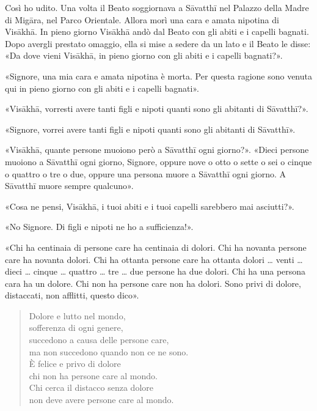 

 Così ho udito. Una volta il Beato soggiornava a Sāvatthī nel
Palazzo della Madre di Migāra, nel Parco Orientale. Allora morì una cara
e amata nipotina di Visākhā. In pieno giorno Visākhā andò dal Beato con
gli abiti e i capelli bagnati. Dopo avergli prestato omaggio, ella si
mise a sedere da un lato e il Beato le disse: «Da dove vieni Visākhā, in
pieno giorno con gli abiti e i capelli bagnati?».


«Signore, una mia cara e amata nipotina è morta. Per questa ragione sono
venuta qui in pieno giorno con gli abiti e i capelli bagnati».


«Visākhā, vorresti avere tanti figli e nipoti quanti sono gli abitanti
di Sāvatthī?».


«Signore, vorrei avere tanti figli e nipoti quanti sono gli abitanti di
Sāvatthī».


«Visākhā, quante persone muoiono però a Sāvatthī ogni giorno?». «Dieci
persone muoiono a Sāvatthī ogni giorno, Signore, oppure nove o otto o
sette o sei o cinque o quattro o tre o due, oppure una persona muore a
Sāvatthī ogni giorno. A Sāvatthī muore sempre qualcuno».


«Cosa ne pensi, Visākhā, i tuoi abiti e i tuoi capelli sarebbero mai
asciutti?».


«No Signore. Di figli e nipoti ne ho a sufficienza!».


«Chi ha centinaia di persone care ha centinaia di dolori. Chi ha novanta
persone care ha novanta dolori. Chi ha ottanta persone care ha ottanta
dolori … venti … dieci … cinque … quattro … tre … due persone ha due
dolori. Chi ha una persona cara ha un dolore. Chi non ha persone care
non ha dolori. Sono privi di dolore, distaccati, non afflitti, questo
dico».


\begin{quote}
Dolore e lutto nel mondo, \\
sofferenza di ogni genere, \\
succedono a causa delle persone care, \\
ma non succedono quando non ce ne sono. \\
È felice e privo di dolore \\
chi non ha persone care al mondo. \\
Chi cerca il distacco senza dolore \\
non deve avere persone care al mondo.
\end{quote}

